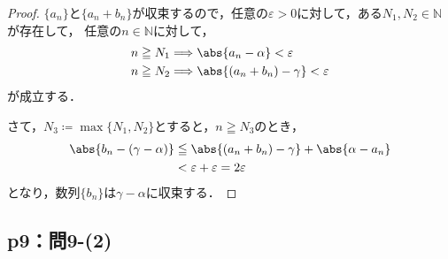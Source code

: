 \documentclass[uplatex,dvipdfmx,a4paper,10pt,fleqn]{jsarticle}
\begin{document}
    \begin{tleftbar}
        \begin{proof}
        $\{ a_n \}$と$ \{ a_n + b_n \}$が収束するので，任意の$\varepsilon >0$に対して，ある$N_1 , N_2 \in \mathbb{N}$が存在して，
        任意の$n \in \mathbb{N}$に対して，
        \begin{align*} 
            &n \geqq N_1 \Longrightarrow \abs{a_n - \alpha}<\varepsilon \\
            & n \geqq N_2 \Longrightarrow \abs{(a_n + b_n)-\gamma}<\varepsilon 
        \end{align*} 
        が成立する．

        さて，$N_3 \coloneqq \max \{ N_1 , N_2 \}$とすると，$n \geqq N_3$のとき，
        \begin{align*} 
            \abs{b_n - (\gamma - \alpha )} & \leqq  \abs{(a_n+b_n)-\gamma} + \abs{\alpha - a_n} \\
            & < \varepsilon + \varepsilon = 2 \varepsilon 
        \end{align*}
        となり，数列$\{b_n \}$は$\gamma - \alpha $に収束する．
    \end{proof}
    \end{tleftbar}


    \subsection*{p9：問9-(2)}
\end{document}
